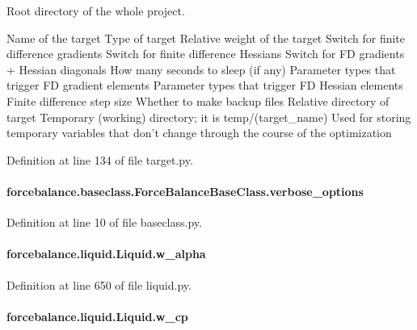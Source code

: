 Root directory of the whole project. 

Name of the target Type of target Relative weight of the target Switch for finite difference gradients Switch for finite difference Hessians Switch for F\-D gradients + Hessian diagonals How many seconds to sleep (if any) Parameter types that trigger F\-D gradient elements Parameter types that trigger F\-D Hessian elements Finite difference step size Whether to make backup files Relative directory of target Temporary (working) directory; it is temp/(target\-\_\-name) Used for storing temporary variables that don't change through the course of the optimization 

Definition at line 134 of file target.\-py.

\hypertarget{classforcebalance_1_1baseclass_1_1ForceBalanceBaseClass_a8088e1e20cbd6bc175fb9c9fe9fa0f18}{
\paragraph[{verbose\-\_\-options}]{\setlength{\rightskip}{0pt plus 5cm}forcebalance.\-baseclass.\-Force\-Balance\-Base\-Class.\-verbose\-\_\-options\hspace{0.3cm}{\ttfamily [inherited]}}}\label{classforcebalance_1_1baseclass_1_1ForceBalanceBaseClass_a8088e1e20cbd6bc175fb9c9fe9fa0f18}


Definition at line 10 of file baseclass.\-py.

\hypertarget{classforcebalance_1_1liquid_1_1Liquid_a0d36d27d8c406b53bbb1096fbb76adbb}{
\paragraph[{w\-\_\-alpha}]{\setlength{\rightskip}{0pt plus 5cm}forcebalance.\-liquid.\-Liquid.\-w\-\_\-alpha}}\label{classforcebalance_1_1liquid_1_1Liquid_a0d36d27d8c406b53bbb1096fbb76adbb}


Definition at line 650 of file liquid.\-py.

\hypertarget{classforcebalance_1_1liquid_1_1Liquid_a3809c649d95ac6c9f662d599e6b1b93d}{
\paragraph[{w\-\_\-cp}]{\setlength{\rightskip}{0pt plus 5cm}forcebalance.\-liquid.\-Liquid.\-w\-\_\-cp}}\label{classforcebalance_1_1liquid_1_1Liquid_a3809c649d95ac6c9f662d599e6b1b93d}


